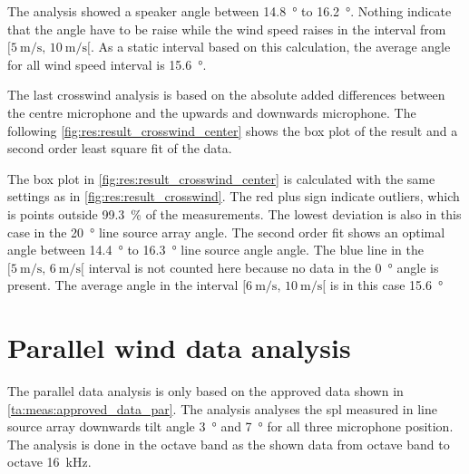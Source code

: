 The analysis showed a speaker angle between \SI{14.8}{\degree} to  \SI{16.2}{\degree}. Nothing indicate that the angle have to be raise while the wind speed raises in the interval from $[\SI{5}{\meter\per\second},\, \SI{10}{\meter\per\second}[ $. As a static interval based on this calculation, the average angle for all wind speed interval is \SI{15.6}{\degree}.

The last crosswind analysis is based on the absolute added differences between the centre microphone and the upwards and downwards microphone. The following \autoref{fig:res:result_crosswind_center} shows the box plot of the result and a second order least square fit of the data. 
 

The box plot in \autoref{fig:res:result_crosswind_center} is calculated with the same settings as in  \autoref{fig:res:result_crosswind}. The red plus sign indicate outliers, which is points outside \SI{99.3}{\percent} of the measurements. The lowest deviation is also in this case in the \SI{20}{\degree} line source array angle. The second order fit shows an optimal angle between \SI{14.4}{\degree} to \SI{16.3}{\degree} line source angle angle. The blue line in the $[\SI{5}{\meter\per\second},\, \SI{6}{\meter\per\second}[ $ interval is not counted here because no data in the \SI{0}{\degree} angle is present. The average angle in the interval $[\SI{6}{\meter\per\second},\, \SI{10}{\meter\per\second}[ $ is in this case \SI{15.6}{\degree}
  
  

\section{Parallel wind data analysis}\label{res:par_data_ana}

The parallel data analysis is only based on the approved data shown in \autoref{ta:meas:approved_data_par}. The analysis analyses the \gls{spl} measured in line source array downwards tilt angle \SI{3}{\degree} and  \SI{7}{\degree} for all three microphone position. The analysis is done in the octave band as the shown data from octave band  to octave \SI{16}{\kilo\hertz}. 

